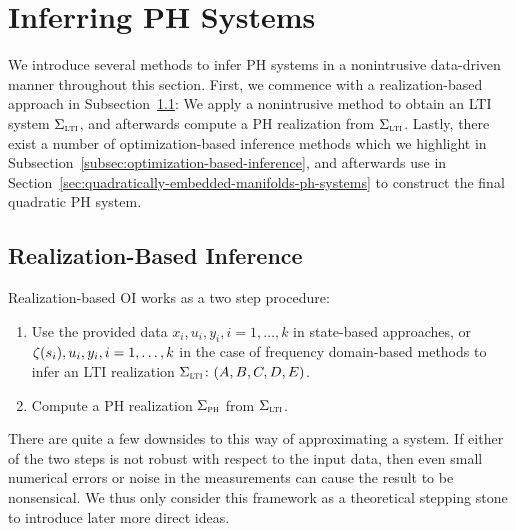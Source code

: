 \section{Inferring \texorpdfstring{\ac{PH}}{PH} Systems}\label{sec:inferring-ph-systems}

We introduce several methods to infer \ac{PH} systems in a nonintrusive data-driven manner throughout this section.
First, we commence with a realization-based approach in Subsection~\ref{subsec:realization-based-inference}: We apply a nonintrusive method to obtain an \ac{LTI} system $\Sigma_{\textnormal{\scshape lti}}$, and afterwards compute a \ac{PH} realization from $\Sigma_{\textnormal{\scshape lti}}$.
Lastly, there exist a number of optimization-based inference methods which we highlight in Subsection~\ref{subsec:optimization-based-inference}, and afterwards use in Section~\ref{sec:quadratically-embedded-manifolds-ph-systems} to construct the final quadratic \ac{PH} system.

\subsection{Realization-Based Inference}\label{subsec:realization-based-inference}

Realization-based \ac{OI} works as a two step procedure:
\begin{enumerate}
    \item Use the provided data $x_i, u_i, y_i, i = 1, \dots, k$ in state-based approaches, or $\zeta(s_i), u_i, y_i, i = 1, \dots, k$ in the case of frequency domain-based methods to infer an \ac{LTI} realization $\Sigma_{\textnormal{\scshape lti}} \colon (A, B, C, D, E)$.
    \item Compute a \ac{PH} realization $\Sigma_{\textnormal{\scshape ph}}$ from $\Sigma_{\textnormal{\scshape lti}}$.
\end{enumerate}
There are quite a few downsides to this way of approximating a system.
If either of the two steps is not robust with respect to the input data, then even small numerical errors or noise in the measurements can cause the result to be nonsensical.
We thus only consider this framework as a theoretical stepping stone to introduce later more direct ideas.

